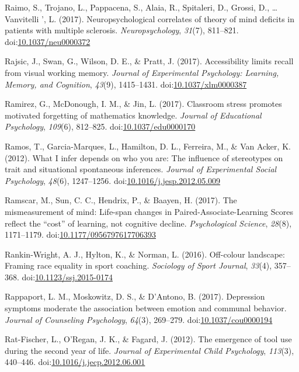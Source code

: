 \documentclass[english,man]{apa6}
\theoremstyle{definition}
\theoremstyle{definition}
\theoremstyle{definition}
\theoremstyle{remark}
\begin{document}
\hypertarget{ref-Raimo2017}{}
Raimo, S., Trojano, L., Pappacena, S., Alaia, R., Spitaleri, D., Grossi,
D., \ldots{} Vanvitelli ', L. (2017). Neuropsychological correlates of
theory of mind deficits in patients with multiple sclerosis.
\emph{Neuropsychology}, \emph{31}(7), 811--821.
doi:\href{https://doi.org/10.1037/neu0000372}{10.1037/neu0000372}

\hypertarget{ref-Rajsic2017}{}
Rajsic, J., Swan, G., Wilson, D. E., \& Pratt, J. (2017). Accessibility
limits recall from visual working memory. \emph{Journal of Experimental
Psychology: Learning, Memory, and Cognition}, \emph{43}(9), 1415--1431.
doi:\href{https://doi.org/10.1037/xlm0000387}{10.1037/xlm0000387}

\hypertarget{ref-Ramirez2017}{}
Ramirez, G., McDonough, I. M., \& Jin, L. (2017). Classroom stress
promotes motivated forgetting of mathematics knowledge. \emph{Journal of
Educational Psychology}, \emph{109}(6), 812--825.
doi:\href{https://doi.org/10.1037/edu0000170}{10.1037/edu0000170}

\hypertarget{ref-Ramos2012}{}
Ramos, T., Garcia-Marques, L., Hamilton, D. L., Ferreira, M., \& Van
Acker, K. (2012). What I infer depends on who you are: The influence of
stereotypes on trait and situational spontaneous inferences.
\emph{Journal of Experimental Social Psychology}, \emph{48}(6),
1247--1256.
doi:\href{https://doi.org/10.1016/j.jesp.2012.05.009}{10.1016/j.jesp.2012.05.009}

\hypertarget{ref-Ramscar2017}{}
Ramscar, M., Sun, C. C., Hendrix, P., \& Baayen, H. (2017). The
mismeasurement of mind: Life-span changes in Paired-Associate-Learning
Scores reflect the ``cost'' of learning, not cognitive decline.
\emph{Psychological Science}, \emph{28}(8), 1171--1179.
doi:\href{https://doi.org/10.1177/0956797617706393}{10.1177/0956797617706393}

\hypertarget{ref-Rankin-Wright2016}{}
Rankin-Wright, A. J., Hylton, K., \& Norman, L. (2016). Off-colour
landscape: Framing race equality in sport coaching. \emph{Sociology of
Sport Journal}, \emph{33}(4), 357--368.
doi:\href{https://doi.org/10.1123/ssj.2015-0174}{10.1123/ssj.2015-0174}

\hypertarget{ref-Rappaport2017}{}
Rappaport, L. M., Moskowitz, D. S., \& D'Antono, B. (2017). Depression
symptoms moderate the association between emotion and communal behavior.
\emph{Journal of Counseling Psychology}, \emph{64}(3), 269--279.
doi:\href{https://doi.org/10.1037/cou0000194}{10.1037/cou0000194}

\hypertarget{ref-Rat-Fischer2012}{}
Rat-Fischer, L., O'Regan, J. K., \& Fagard, J. (2012). The emergence of
tool use during the second year of life. \emph{Journal of Experimental
Child Psychology}, \emph{113}(3), 440--446.
doi:\href{https://doi.org/10.1016/j.jecp.2012.06.001}{10.1016/j.jecp.2012.06.001}
\end{document}

